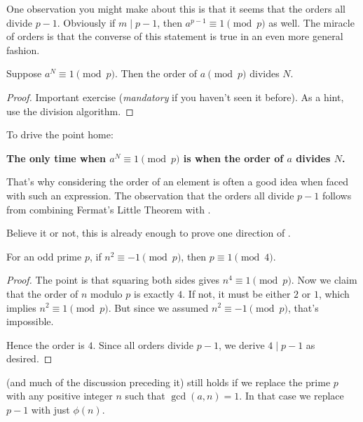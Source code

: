 \documentclass[11pt]{scrartcl}
\begin{document}
One observation you might make about this is that it seems that the orders all divide $p-1$.
Obviously if $m \mid p-1$, then $a^{p-1} \equiv 1 \pmod p$ as well.
The miracle of orders is that the converse of this statement is true in an even more general fashion.

\begin{theorem}
  Suppose $a^N \equiv 1 \pmod p$.
  Then the order of $a \pmod p$ divides $N$.
  \label{thm:fundamental_order}
\end{theorem}
\begin{proof}
  Important exercise (\emph{mandatory} if you haven't seen it before).
  As a hint, use the division algorithm.
\end{proof}

To drive the point home:
\begin{center}
  \begin{minipage}[h]{9cm}
    \begin{mdframed}
    \bfseries
    \color{magenta}
    The only time when $a^N \equiv 1 \pmod p$ is when the order of $a$ divides $N$.
    \end{mdframed}
  \end{minipage}
\end{center}
That's why considering the order of an element is often a good idea when faced with such an expression.
The observation that the orders all divide $p-1$ follows from combining
Fermat's Little Theorem with .

Believe it or not, this is already enough to prove one direction of .

\begin{proposition}
  For an odd prime $p$, if $n^2 \equiv -1 \pmod p$, then $p \equiv 1 \pmod 4$.
\end{proposition}
\begin{proof}
  The point is that squaring both sides gives $n^4 \equiv 1 \pmod p$.
  Now we claim that the order of $n$ modulo $p$ is exactly $4$.
  If not, it must be either $2$ or $1$, which implies $n^2 \equiv 1 \pmod p$.
  But since we assumed $n^2 \equiv -1 \pmod p$, that's impossible.

  Hence the order is $4$.
  Since all orders divide $p-1$, we derive $4 \mid p-1$ as desired.
\end{proof}

\begin{remark*}
   (and much of the discussion preceding it)
  still holds if we replace the prime $p$ with
  any positive integer $n$ such that $\gcd(a,n) = 1$.
  In that case we replace $p-1$ with just $\phi(n)$.
\end{remark*}
\end{document}
